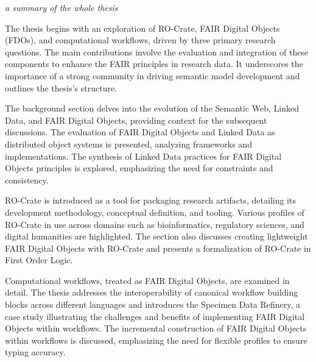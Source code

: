 \emph{a summary of the whole thesis}


The thesis begins with an exploration of RO-Crate, FAIR Digital Objects (FDOs), and computational workflows, driven by three primary research questions. The main contributions involve the evaluation and integration of these components to enhance the FAIR principles in research data. It underscores the importance of a strong community in driving semantic model development and outlines the thesis's structure.

The background section delves into the evolution of the Semantic Web, Linked Data, and FAIR Digital Objects, providing context for the subsequent discussions. The evaluation of FAIR Digital Objects and Linked Data as distributed object systems is presented, analyzing frameworks and implementations. The synthesis of Linked Data practices for FAIR Digital Objects principles is explored, emphasizing the need for constraints and consistency.

RO-Crate is introduced as a tool for packaging research artifacts, detailing its development methodology, conceptual definition, and tooling. Various profiles of RO-Crate in use across domains such as bioinformatics, regulatory sciences, and digital humanities are highlighted. The section also discusses creating lightweight FAIR Digital Objects with RO-Crate and presents a formalization of RO-Crate in First Order Logic.

Computational workflows, treated as FAIR Digital Objects, are examined in detail. The thesis addresses the interoperability of canonical workflow building blocks across different languages and introduces the Specimen Data Refinery, a case study illustrating the challenges and benefits of implementing FAIR Digital Objects within workflows. The incremental construction of FAIR Digital Objects within workflows is discussed, emphasizing the need for flexible profiles to ensure typing accuracy.

